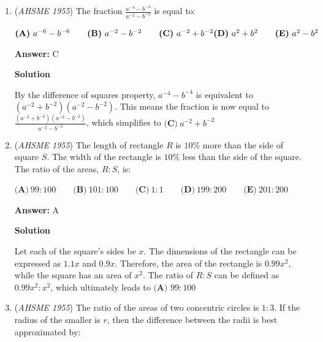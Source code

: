\begin{enumerate}
\textbf{Solution 2}

Let us test the answer choices, for it is in this case simpler and quicker. $x=0$ and $x=2/3$ obviously doesn't work, since square roots of negative numbers are not real. $x=2$ doesn't work either, because the first term is already bigger than 2, and the second term cannot be negative. By the process of elimination, the answer is $\boxed{{\textbf{(D) }} x=1}$.

 


	\item (\textit{AHSME 1955}) The fraction $\frac{a^{-4}-b^{-4}}{a^{-2}-b^{-2}}$ is equal to: 


 $\textbf{(A)}\ a^{-6}-b^{-6}\qquad\textbf{(B)}\ a^{-2}-b^{-2}\qquad\textbf{(C)}\ a^{-2}+b^{-2}\\ \textbf{(D)}\ a^2+b^2\qquad\textbf{(E)}\ a^2-b^2$

 \textbf{Answer: }C



\textbf{Solution}

By the difference of squares property, $a^{-4} - b^{-4}$ is equivalent to $(a^{-2} + b^{-2})(a^{-2} - b^{-2})$. This means the fraction is now equal to $\frac{(a^{-2} + b^{-2})(a^{-2} - b^{-2})}{a^{-2} - b^{-2}}$, which simplifies to $\textbf{(C)}\ a^{-2}+b^{-2}$



	\item (\textit{AHSME 1955}) The length of rectangle $R$ is $10$\% more than the side of square $S$. The width of the rectangle is $10$\% less than the side of the square. 
The ratio of the areas, $R:S$, is: 


 $\textbf{(A)}\ 99: 100\qquad\textbf{(B)}\ 101: 100\qquad\textbf{(C)}\ 1: 1\qquad\textbf{(D)}\ 199: 200\qquad\textbf{(E)}\ 201: 200$

 \textbf{Answer: }A



\textbf{Solution}

Let each of the square's sides be $x$. The dimensions of the rectangle can be expressed as $1.1x$ and $0.9x$. Therefore, the area of the rectangle is $0.99x^2$, while the square has an area of $x^2$. The ratio of $R : S$ can be defined as $0.99x^2 : x^2$, which ultimately leads to $\textbf{(A) } 99 : 100$



	\item (\textit{AHSME 1955}) The ratio of the areas of two concentric circles is $1: 3$. If the radius of the smaller is $r$, then the difference between the 
radii is best approximated by: 



\end{enumerate}
